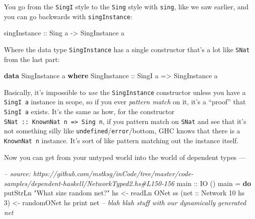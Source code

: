 \documentclass[]{article}
\newenvironment{Shaded}{}{}
\newcommand{\KeywordTok}[1]{\textcolor[rgb]{0.00,0.44,0.13}{\textbf{{#1}}}}
\newcommand{\DataTypeTok}[1]{\textcolor[rgb]{0.56,0.13,0.00}{{#1}}}
\newcommand{\DecValTok}[1]{\textcolor[rgb]{0.25,0.63,0.44}{{#1}}}
\newcommand{\StringTok}[1]{\textcolor[rgb]{0.25,0.44,0.63}{{#1}}}
\newcommand{\CommentTok}[1]{\textcolor[rgb]{0.38,0.63,0.69}{\textit{{#1}}}}
\newcommand{\OtherTok}[1]{\textcolor[rgb]{0.00,0.44,0.13}{{#1}}}
\newcommand{\FunctionTok}[1]{\textcolor[rgb]{0.02,0.16,0.49}{{#1}}}
\newcommand{\NormalTok}[1]{{#1}}
\begin{document}
You go from the \texttt{SingI} style to the \texttt{Sing} style with
\texttt{sing}, like we saw earlier, and you can go backwards with
\texttt{singInstance}:

\begin{Shaded}
\begin{Highlighting}[]
\OtherTok{singInstance ::} \DataTypeTok{Sing} \NormalTok{a }\OtherTok{->} \DataTypeTok{SingInstance} \NormalTok{a}
\end{Highlighting}
\end{Shaded}

Where the data type \texttt{SingInstance} has a single constructor that's a lot
like \texttt{SNat} from the last part:

\begin{Shaded}
\begin{Highlighting}[]
\KeywordTok{data} \DataTypeTok{SingInstance} \NormalTok{a }\KeywordTok{where}
    \DataTypeTok{SingInstance}\OtherTok{ ::} \DataTypeTok{SingI} \NormalTok{a }\OtherTok{=>} \DataTypeTok{SingInstance} \NormalTok{a}
\end{Highlighting}
\end{Shaded}

Basically, it's impossible to \emph{use} the \texttt{SingInstance} constructor
unless you have a \texttt{SingI\ a} instance in scope, so if you ever
\emph{pattern match} on it, it's a ``proof'' that \texttt{SingI\ a} exists. It's
the same as how, for the constructor
\texttt{SNat\ ::\ KnownNat\ n\ =\textgreater{}\ Sing\ n}, if you pattern match
on \texttt{SNat} and see that it's not something silly like
\texttt{undefined}/\texttt{error}/bottom, GHC knows that there is a
\texttt{KnownNat\ n} instance. It's sort of like pattern matching out the
instance itself.

Now you can get from your untyped world into the world of dependent types ---

\begin{Shaded}
\begin{Highlighting}[]
\CommentTok{-- source: https://github.com/mstksg/inCode/tree/master/code-samples/dependent-haskell/NetworkTyped2.hs#L150-156}
\OtherTok{main ::} \DataTypeTok{IO} \NormalTok{()}
\NormalTok{main }\FunctionTok{=} \KeywordTok{do}
    \NormalTok{putStrLn }\StringTok{"What size random net?"}
    \NormalTok{hs }\OtherTok{<-} \NormalTok{readLn}
    \DataTypeTok{ONet} \NormalTok{ss (}\OtherTok{net ::} \DataTypeTok{Network} \DecValTok{10} \NormalTok{hs }\DecValTok{3}\NormalTok{) }\OtherTok{<-} \NormalTok{randomONet hs}
    \NormalTok{print net}
    \CommentTok{-- blah blah stuff with our dynamically generated net}
\end{Highlighting}
\end{Shaded}
\end{document}
